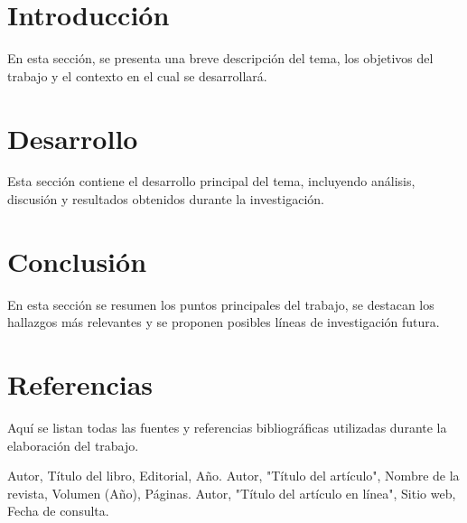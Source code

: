 \documentclass{article}
\begin{document}
\section{Introducción}
En esta sección, se presenta una breve descripción del tema, los objetivos del trabajo y el contexto en el cual se desarrollará.

\newpage
\section{Desarrollo}
Esta sección contiene el desarrollo principal del tema, incluyendo análisis, discusión y resultados obtenidos durante la investigación.


\newpage
\section{Conclusión}
En esta sección se resumen los puntos principales del trabajo, se destacan los hallazgos más relevantes y se proponen posibles líneas de investigación futura.

\newpage
\section{Referencias}
Aquí se listan todas las fuentes y referencias bibliográficas utilizadas durante la elaboración del trabajo.

\begin{thebibliography}{9}
     Autor, Título del libro, Editorial, Año.
     Autor, "Título del artículo", Nombre de la revista, Volumen (Año), Páginas.
     Autor, "Título del artículo en línea", Sitio web, Fecha de consulta.
\end{thebibliography}

\newpage
\end{document}
